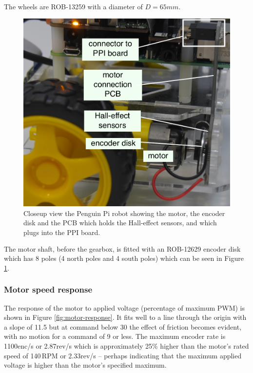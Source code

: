 \documentclass[11pt,fleqn]{article}
\begin{document}
The wheels are ROB-13259 with a diameter of $D=65\unit{mm}$.

\begin{figure}
\centering
\includegraphics[width=12cm]{motor-annotated.pdf}
\caption{Closeup view the Penguin Pi robot showing the motor, the encoder disk and the PCB which holds the Hall-effect sensors, and 
which plugs into the PPI board.}\label{fig:robot-closeup}
\end{figure}

The motor shaft, before the gearbox, is fitted with an ROB-12629 encoder disk which has 8  poles (4 north poles and 4 south poles) which can be
seen in Figure \ref{fig:robot-closeup}.


\subsubsection{Motor speed response}\label{sec:motor-control}

The response of the motor to applied voltage (percentage of maximum PWM) is shown in Figure \ref{fig:motor-response}. 
It fits well to a line through the origin with a slope of 11.5 but at command below 30 the effect of friction becomes
evident, with no motion for a command of 9 or less.
The maximum encoder rate is 1100\unit{enc/s} or 2.87\unit{rev/s} which is approximately 25\% higher than the motor's rated speed
of 140\,RPM or 2.33\unit{rev/s} -- perhaps indicating that the maximum applied voltage is higher than the motor's specified maximum.
\end{document}
